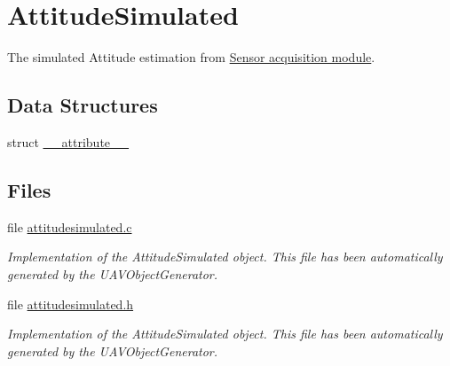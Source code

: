 \hypertarget{group___attitude_simulated}{\section{\-Attitude\-Simulated}
\label{group___attitude_simulated}
}


\-The simulated \-Attitude estimation from \hyperlink{group___sensors}{\-Sensor acquisition module}.  


\subsection*{\-Data \-Structures}
\begin{DoxyCompactItemize}
\item 
struct \hyperlink{struct____attribute____}{\-\_\-\-\_\-attribute\-\_\-\-\_\-}
\end{DoxyCompactItemize}
\subsection*{\-Files}
\begin{DoxyCompactItemize}
\item 
file \hyperlink{attitudesimulated_8c}{attitudesimulated.\-c}
\begin{DoxyCompactList}\small\item\em \-Implementation of the \-Attitude\-Simulated object. \-This file has been automatically generated by the \-U\-A\-V\-Object\-Generator. \end{DoxyCompactList}\item 
file \hyperlink{attitudesimulated_8h}{attitudesimulated.\-h}
\begin{DoxyCompactList}\small\item\em \-Implementation of the \-Attitude\-Simulated object. \-This file has been automatically generated by the \-U\-A\-V\-Object\-Generator. \end{DoxyCompactList}\end{DoxyCompactItemize}
